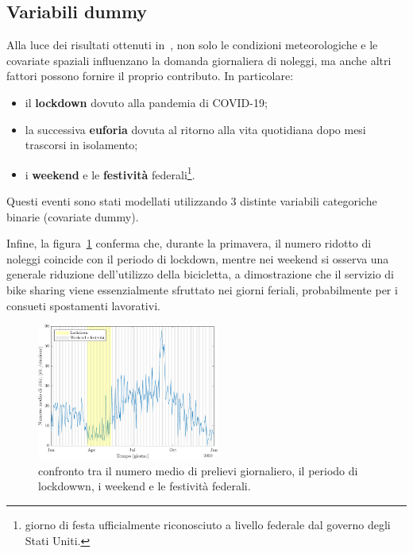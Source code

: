 \subsection[Variabili dummy]{Variabili dummy}
Alla luce dei risultati ottenuti in~\citep{paper_bike_sharing_Otto}, non solo le condizioni meteorologiche e le covariate spaziali influenzano la domanda giornaliera di noleggi, ma anche altri fattori possono fornire il proprio contributo. In particolare:
\begin{itemize}
	\item il \textbf{lockdown} dovuto alla pandemia di COVID-\num{19};
	\item la successiva \textbf{euforia} dovuta al ritorno alla vita quotidiana dopo mesi trascorsi in isolamento;
	\item i \textbf{weekend} e le \textbf{festività} federali\footnote{giorno di festa ufficialmente riconosciuto a livello federale dal governo degli Stati Uniti.}.
\end{itemize}
Questi eventi sono stati modellati utilizzando \num{3} distinte variabili categoriche binarie (covariate dummy).
\par Infine, la figura~\ref{ritiri_vs_dummy} conferma che, durante la primavera, il numero ridotto di noleggi coincide con il periodo di lockdown, mentre nei weekend si osserva una generale riduzione dell'utilizzo della bicicletta, a dimostrazione che il servizio di bike sharing viene essenzialmente sfruttato nei giorni feriali, probabilmente per i consueti spostamenti lavorativi.

\begin{figure}[htpb]
	\centering
	\includegraphics[height=170px]{Immagini/4. Caso di studio/Serie storiche/Ritiri giornalieri e dummy}
	\caption[Confronto tra il numero medio di prelievi giornaliero, il periodo di lockdowwn, i weekend e le festività federali.]{confronto tra il numero medio di prelievi giornaliero, il periodo di lockdowwn, i weekend e le festività federali.}
	\label{ritiri_vs_dummy}
\end{figure}

